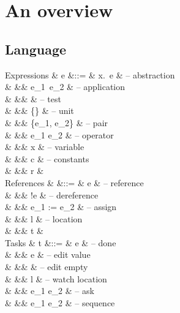 
\newpage
\section{An overview}


\subsection{Language}

\begin{grammar}
  Expressions
    & e      &::= & \lambda x.\ e               & – abstraction \\
    &        &\mid& e_1\ e_2                    & – application \\
    &        &\mid&           & – test \\
    &        &\mid& \{\}                        & – unit \\
    &        &\mid& \{e_1, e_2\}                & – pair \\
    &        &\mid& e_1 \star e_2               & – operator \\
    &        &\mid& x                           & – variable \\
    &        &\mid& c                           & – constants \\
    &        &\mid& r                           & \\
  References
    &        &::= & \Ref e                      & – reference \\
    &        &\mid& !e                          & – dereference \\
    &        &\mid& e_1 := e_2                  & – assign \\
    &        &\mid& l                           & – location \\
    &        &\mid& t                           & \\
  Tasks
    & t      &::= & \Done e                     & – done \\
    &        &\mid& \Edit e                     & – edit value \\
    &        &\mid& \Empty \tau                 & – edit empty \\
    &        &\mid& \Watch l                    & – watch location \\
    &        &\mid& e_1 \Then e_2               & – ask \\
    &        &\mid& e_1 \When e_2               & – sequence \\

\end{grammar}

